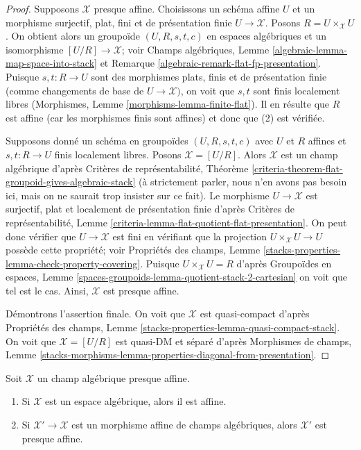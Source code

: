 \begin{proof}
Supposons $\mathcal{X}$ presque affine. Choisissons un schéma affine $U$
et un morphisme surjectif, plat, fini et de présentation finie
$U \to \mathcal{X}$. Posons $R = U \times_\mathcal{X} U$. On
obtient alors un groupoïde $(U, R, s, t, c)$ en espaces algébriques et un
isomorphisme $[U/R] \to \mathcal{X}$; voir
Champs algébriques, Lemme \ref{algebraic-lemma-map-space-into-stack}
et Remarque \ref{algebraic-remark-flat-fp-presentation}.
Puisque $s, t : R \to U$ sont des morphismes
plats, finis et de présentation finie
(comme changements de base de $U \to \mathcal{X})$, on voit que
$s, t$ sont finis localement libres
(Morphismes, Lemme \ref{morphisms-lemma-finite-flat}).
Il en résulte que $R$ est affine (car les morphismes finis sont affines)
et donc que (2) est vérifiée.

\medskip\noindent
Supposons donné un schéma en groupoïdes $(U, R, s, t, c)$ avec $U$ et
$R$ affines et $s, t : R \to U$ finis localement libres.
Posons $\mathcal{X} = [U/R]$. Alors $\mathcal{X}$ est un champ algébrique
d'après Critères de représentabilité, Théorème
\ref{criteria-theorem-flat-groupoid-gives-algebraic-stack} (à strictement parler,
nous n'en avons pas besoin ici, mais on ne saurait trop insister sur ce fait).
Le morphisme $U \to \mathcal{X}$ est surjectif, plat et localement
de présentation finie d'après
Critères de représentabilité, Lemme
\ref{criteria-lemma-flat-quotient-flat-presentation}.
On peut donc vérifier que $U \to \mathcal{X}$ est fini en
vérifiant que la projection $U \times_\mathcal{X} U \to U$
possède cette propriété; voir Propriétés des champs, Lemme
\ref{stacks-properties-lemma-check-property-covering}.
Puisque $U \times_\mathcal{X} U = R$ d'après
Groupoïdes en espaces, Lemme
\ref{spaces-groupoids-lemma-quotient-stack-2-cartesian}
on voit que tel est le cas. Ainsi, $\mathcal{X}$ est presque affine.

\medskip\noindent
Démontrons l'assertion finale. On voit que $\mathcal{X}$
est quasi-compact d'après Propriétés des champs, Lemme
\ref{stacks-properties-lemma-quasi-compact-stack}.
On voit que $\mathcal{X} = [U/R]$ est quasi-DM et séparé d'après
Morphismes de champs, Lemme
\ref{stacks-morphisms-lemma-properties-diagonal-from-presentation}.
\end{proof}

\begin{lemma}
\label{lemma-affine-over-well-nigh-affine}
Soit $\mathcal{X}$ un champ algébrique presque affine.
\begin{enumerate}
\item Si $\mathcal{X}$ est un espace algébrique, alors il est affine.
\item Si $\mathcal{X}' \to \mathcal{X}$ est un morphisme affine
de champs algébriques, alors $\mathcal{X}'$ est presque affine.
\end{enumerate}
\end{lemma}

